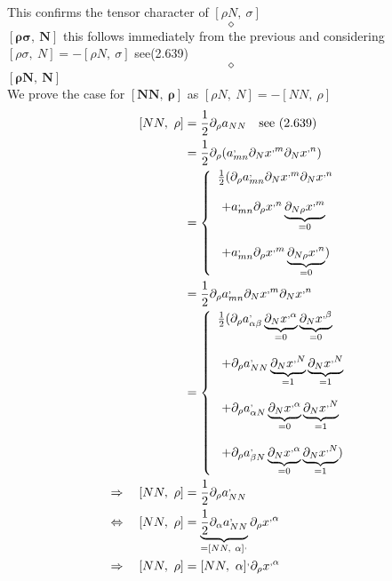 This confirms the tensor character of $[ \rho N, \  \sigma] $
$$\diamond$$
$\boldsymbol{[ \rho \sigma, \  N]}$ this follows immediately from the previous and considering $[ \rho \sigma, \  N] = - [ \rho N, \  \sigma]$ see(2.639) \\
$$\diamond$$
$\boldsymbol{[\rho N, \ N ] }$\\
We prove the case for $\boldsymbol{[ NN, \ \rho ]}$  as $[\rho N, \ N ] = -[ NN, \ \rho ] $
\begin{align}
\ [ NN, \ \rho ] &= \half \partial_{\rho} a_{NN}\quad \text{see (2.639)}\\
\ &= \half \partial_{\rho} (a^{,}_{mn}\partial_{N}x^{,m}\partial_{N}x^{,n})\\
\ & = \left\{ \begin{array}{l}
\half (\partial_{\rho} a^{,}_{mn}\partial_{N}x^{,m}\partial_{N}x^{,n}\\\\
\ + a^{,}_{mn} \partial_{\rho}x^{,n} \underbrace{\partial_{N \rho}x^{,m}}_{=0}\\\\
\ + a^{,}_{mn} \partial_{\rho}x^{,m} \underbrace{\partial_{N \rho}x^{,n}}_{=0})
\end{array} \right.\\
\ &= \half \partial_{\rho} a^{,}_{mn}\partial_{N}x^{,m}\partial_{N}x^{,n}\\
\ &= \left\{ \begin{array}{l}
\half (\partial_{\rho} a^{,}_{\alpha\beta}\underbrace{\partial_{N}x^{,\alpha}}_{=0}\underbrace{\partial_{N}x^{,\beta}}_{=0}\\\\
\ +\partial_{\rho} a^{,}_{NN}\underbrace{\partial_{N}x^{,N}}_{=1}\underbrace{\partial_{N}x^{,N}}_{=1}\\\\
\ +\partial_{\rho} a^{,}_{\alpha N}\underbrace{\partial_{N}x^{,\alpha}}_{=0}\underbrace{\partial_{N}x^{,N}}_{=1}\\\\
\ +\partial_{\rho} a^{,}_{\beta N}\underbrace{\partial_{N}x^{,\alpha}}_{=0}\underbrace{\partial_{N}x^{,N}}_{=1})\\
\end{array} \right.\\
\Rightarrow \quad [ NN, \ \rho ] &= \half \partial_{\rho} a^{,}_{NN}\\
\Leftrightarrow \quad [ NN, \ \rho ] &=  \underbrace{\half \partial_{\alpha} a^{,}_{NN}}_{=[NN, \ \alpha]^,}\partial_{\rho}x^{,\alpha}\\
\Rightarrow \quad [ NN, \ \rho ] &=  [NN, \ \alpha]^, \partial_{\rho}x^{,\alpha}
\end{align}
